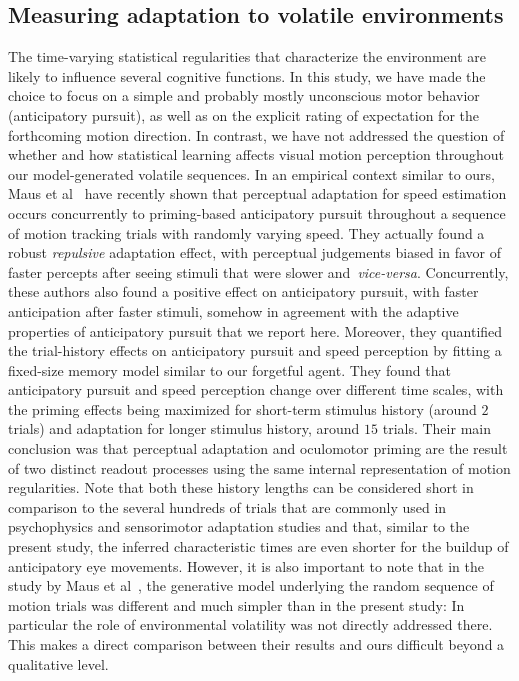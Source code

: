 \documentclass[10pt,letterpaper]{article}
\newcommand{\citet}[1]{\cite{#1}}
\begin{document}
\subsection*{Measuring adaptation to volatile environments}
The time-varying statistical regularities that characterize the environment are likely to influence several cognitive functions. In this study, we have made the choice to focus on a simple and probably mostly unconscious motor behavior (anticipatory pursuit), as well as on the explicit rating of expectation for the forthcoming motion direction. In contrast, we have not addressed the question of whether and how statistical learning affects visual motion perception throughout our model-generated volatile sequences. In an empirical context similar to ours, Maus et al~\citet{Maus2015} have recently shown that perceptual adaptation for speed estimation occurs concurrently to priming-based anticipatory pursuit throughout a sequence of motion tracking trials with randomly varying speed. They actually found a robust \emph{repulsive} adaptation effect, with perceptual judgements biased in favor of faster percepts after seeing stimuli that were slower and~\textit{vice-versa}. Concurrently, these authors also found a positive effect on anticipatory pursuit, with faster anticipation after faster stimuli, somehow in agreement with the adaptive properties of anticipatory pursuit that we report here. Moreover, they quantified the trial-history effects on anticipatory pursuit and speed perception by fitting a fixed-size memory model similar to our forgetful agent. They found that anticipatory pursuit and speed perception change over different time scales, with the priming effects being maximized for short-term stimulus history (around $2$ trials) and adaptation for longer stimulus history, around $15$ trials. Their main conclusion was that perceptual adaptation and oculomotor priming are the result of two distinct readout processes using the same internal representation of motion regularities. Note that both these history lengths can be considered short in comparison to the several hundreds of trials that are commonly used in psychophysics and sensorimotor adaptation studies and that, similar to the present study, the inferred characteristic times are even shorter for the buildup of anticipatory eye movements. However, it is also important to note that in the study by Maus et al~\citet{Maus2015}, the generative model underlying the random sequence of motion trials was different and much simpler than in the present study: In particular the role of environmental volatility was not directly addressed there. This makes a direct comparison between their results and ours difficult beyond a qualitative level.
\end{document}
